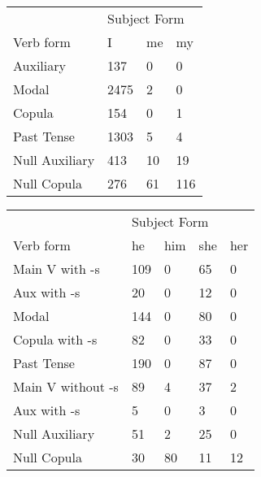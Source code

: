 \begin{table}[]
\begin{minipage}{0.5\textwidth}
    \centering
    \begin{tabular}{@{}llll@{}}
        \toprule
            &\multicolumn{3}{l}{Subject Form}\\
            \cline{2-4}
        Verb form & I & me & my \\
        \midrule
        Auxiliary & 137 & 0 & 0 \\
        Modal & 2475 & 2 & 0 \\
        Copula & 154 & 0 & 1 \\
        Past Tense & 1303 & 5 & 4 \\
        \hline
        Null Auxiliary & 413 & 10 & 19 \\
        Null Copula & 276 & 61 & 116 \\
        \bottomrule
    \end{tabular}
\end{minipage}
\begin{minipage}{0.5\textwidth}
    \centering
    \begin{tabular}{@{}lllll@{}}
        \toprule
            &\multicolumn{4}{l}{Subject Form}\\
            \cline{2-5}
        Verb form & he & him & she & her \\
        \midrule
        Main V with -s & 109 & 0 & 65 & 0 \\
        Aux with -s & 20 & 0 & 12 & 0 \\
        Modal & 144 & 0 & 80 & 0 \\
        Copula with -s & 82 & 0 & 33 & 0 \\
        Past Tense & 190 & 0 & 87 & 0 \\
        \hline
        Main V without -s & 89 & 4 & 37 & 2 \\
        Aux with -s & 5 & 0 & 3 & 0 \\
        Null Auxiliary & 51 & 2 & 25 & 0 \\
        Null Copula & 30 & 80 & 11 & 12 \\
        \bottomrule
    \end{tabular}
    \end{minipage}
\end{table}

